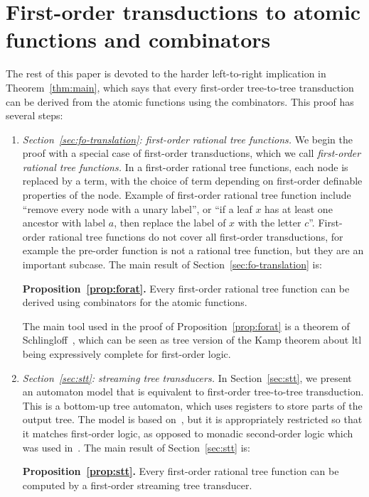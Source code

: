 \section{First-order transductions to  atomic functions and combinators}
\label{sec:strategy}
The rest of this paper is devoted to the harder left-to-right implication in Theorem~\ref{thm:main}, which says that every  first-order tree-to-tree transduction
can be derived from the atomic functions using the combinators. This proof has several steps:

\newcommand{\announce}[2]{
\begin{center}
    {\bf #1.} #2
\end{center}
}
\begin{enumerate}
    \item \emph{Section~\ref{sec:fo-translation}: first-order rational tree functions.} We begin the proof with a special case of first-order transductions, which we call \emph{first-order rational tree functions.} In a first-order rational tree functions, each node is replaced by a term, with the choice of term depending on first-order definable properties of the node. Example of first-order rational tree function include  ``remove every node with a unary label'', or ``if a leaf $x$ has at least one ancestor with label $a$, then replace the label of $x$ with the letter $c$''. First-order rational tree functions do not cover all first-order transductions, for example the pre-order function is not a rational tree function, but they are an important subcase.
    The main result of Section~\ref{sec:fo-translation} is:
    \announce
    {Proposition~\ref{prop:forat}}
    {Every first-order rational tree function can be derived using combinators for the atomic functions.}
    The main tool used in the proof of Proposition~\ref{prop:forat} is a theorem of Schlingloff~\cite[Theorem 2.6]{schlingloff1992expressive}, which can be seen as tree version of the Kamp theorem about {\sc ltl} being  expressively complete for first-order logic.  
    \item \emph{Section~\ref{sec:stt}: streaming tree transducers. }In Section~\ref{sec:stt}, we present an automaton model that is equivalent to  first-order tree-to-tree transduction. This  is a bottom-up tree automaton, which uses registers to store parts of the output tree. The model is based on~\cite{alur2017streaming}, but it is  appropriately restricted so that it matches first-order logic, as opposed to monadic second-order logic which was used in~\cite{alur2017streaming}. The main result of Section~\ref{sec:stt} is:
    \announce
    {Proposition~\ref{prop:stt}}
    {Every first-order rational tree function can be computed by a first-order streaming tree transducer.}
    

\end{enumerate}
